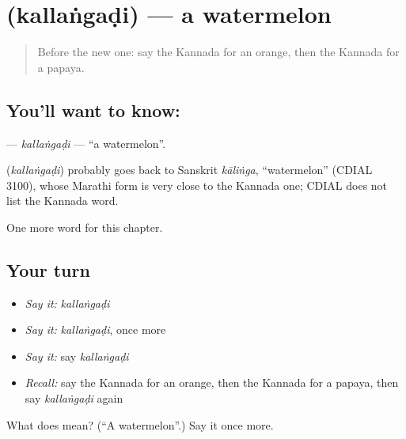 \section[\texorpdfstring{\kn{ಕಲ್ಲಂಗಡಿ} (kallaṅgaḍi)}{ಕಲ್ಲಂಗಡಿ (kallaṅgaḍi)}]{ (kallaṅgaḍi) — a watermelon}

\label{lesson:KA-C221-kallangadi}



\begin{quote}
Before the new one: say the Kannada for an orange, then the Kannada for a papaya.
\end{quote}

\subsection*{You'll want to know: }
\textbf{} — \emph{kallaṅgaḍi} — \textquotedblleft{}a watermelon\textquotedblright{}.

\begin{cousinweb}
\textbf{} (\emph{kallaṅgaḍi}) probably goes back to Sanskrit \emph{kāliṅga}, \textquotedblleft{}watermelon\textquotedblright{} (CDIAL 3100), whose Marathi form is very close to the Kannada one; CDIAL does not list the Kannada word.
\end{cousinweb}

\begin{grammarlens}[title={What you've built}]
One more word for this chapter.
\end{grammarlens}

\subsection*{Your turn}
\begin{itemize}
\raggedright
  \item \emph{Say it:} \emph{kallaṅgaḍi}
  \item \emph{Say it:} \emph{kallaṅgaḍi}, once more
  \item \emph{Say it:} say \emph{kallaṅgaḍi}
  \item \emph{Recall:} say the Kannada for an orange, then the Kannada for a papaya, then say \emph{kallaṅgaḍi} again
\end{itemize}

\begin{tcolorbox}[breakable,colback=teal!4,colframe=teal!35!black,title={Before you move on}]
What does  mean? (\textquotedblleft{}A watermelon\textquotedblright{}.) Say it once more.
\end{tcolorbox}

